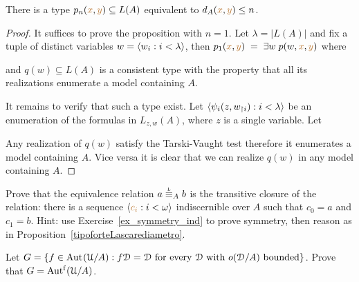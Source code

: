 \begin{proposition}\label{prop_Lascar_distance_type_def}
There is a type $p_n({\color{brown} x},{\color{brown} y})\subseteq L(A)$ equivalent to $d_A({\color{brown} x},{\color{brown} y})\le n$.  
\end{proposition}
\begin{proof}
It suffices to prove the proposition with $n=1$.
Let $\lambda=|L(A)|$ and fix a tuple of distinct variables $w=\langle w_i:i<\lambda\rangle$, then $p_1({\color{brown} x},{\color{brown} y})\;=\;\exists w\;p(w,{\color{brown} x},{\color{brown} y})$ where


and $q(w)\subseteq L(A)$ is a consistent type with the property that all its realizations enumerate a model containing $A$.

It remains to verify that such a type exist.
Let $\langle\psi_i(z,w_{\restriction i}):i<\lambda\rangle$ be an enumeration of the formulas in $L_{z,w}(A)$, where $z$ is a single variable.
Let 


Any realization of $q(w)$ satisfy the Tarski-Vaught test therefore it enumerates a model containing $A$.
Vice versa it is clear that we can realize $q(w)$ in any model containing $A$.
\end{proof}


\begin{exercise}\label{ex_Lstp_indiscernibles}
  Prove that the equivalence relation $a\stackrel{\smash{\scalebox{.5}{\rm L}}}{\equiv}_Ab$ is the transitive closure of the relation: there is a sequence $\langle{\color{brown}c_i}:i<\omega\rangle$ indiscernible over $A$ such that $c_0=a$ and $c_1=b$.
  Hint: use Exercise~\ref{ex_symmetry_ind} to prove symmetry, then reason as in Proposition~\ref{tipoforteLascarediametro}.
\end{exercise}

\begin{exercise}
  Let $G=\{f\in{\rm Aut\kern.15ex}(\EuScript U/A) : f\EuScript D=\EuScript D \textrm{ for every }\EuScript D \textrm{ with }o(\EuScript D/A)\textrm{ bounded}\}$. 
  Prove that $G=\mbox{Aut$^{\rm f}$}(\EuScript U/A)$.
\end{exercise}


